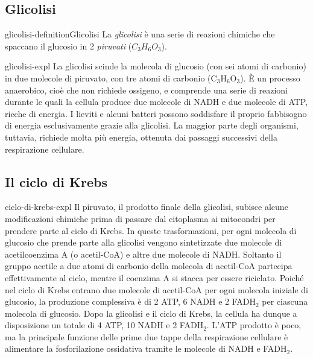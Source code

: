 \documentclass[preview]{standalone}
\begin{document}
\subsection{Glicolisi}

\begin{snippetdefinition}{glicolisi-definition}{Glicolisi}
    La \textit{glicolisi} è una serie di reazioni chimiche che spaccano il glucosio in 2 \textit{piruvati} (\(C_3H_6O_3\)).
\end{snippetdefinition}

\begin{snippet}{glicolisi-expl}
    La glicolisi scinde la molecola di glucosio (con sei atomi di carbonio) in due molecole di
    piruvato, con tre atomi di carbonio (C\({}_3\)H\({}_6\)O\({}_3\)). È un processo anaerobico, cioè che non
    richiede ossigeno, e comprende una serie di reazioni durante le quali la cellula produce due
    molecole di NADH e due molecole di ATP, ricche di energia. I lieviti e alcuni batteri possono
    soddisfare il proprio fabbisogno di energia esclusivamente grazie alla glicolisi. La maggior
    parte degli organismi, tuttavia, richiede molta più energia, ottenuta dai passaggi successivi
    della respirazione cellulare.
\end{snippet}

\subsection{Il ciclo di Krebs}

\begin{snippet}{ciclo-di-krebs-expl}
    Il piruvato, il prodotto finale della glicolisi, subisce alcune modificazioni chimiche prima di
    passare dal citoplasma ai mitocondri per prendere parte al ciclo di Krebs. In queste
    trasformazioni, per ogni molecola di glucosio che prende parte alla glicolisi vengono
    sintetizzate due molecole di acetilcoenzima A (o acetil-CoA) e altre due molecole di NADH.
    Soltanto il gruppo acetile a due atomi di carbonio della molecola di acetil-CoA partecipa
    effettivamente al ciclo, mentre il coenzima A si stacca per essere riciclato. Poiché nel ciclo
    di Krebs entrano due molecole di acetil-CoA per ogni molecola iniziale di glucosio, la
    produzione complessiva è di 2 ATP, 6 NADH e 2 FADH\({}_2\) per ciascuna molecola di glucosio.
    Dopo la glicolisi e il ciclo di Krebs, la cellula ha dunque a disposizione un totale di 4 ATP, 10
    NADH e 2 FADH\({}_2\). L'ATP prodotto è poco, ma la principale funzione delle prime due tappe
    della respirazione cellulare è alimentare la fosforilazione ossidativa tramite le molecole di
    NADH e FADH\({}_2\).
\end{snippet}
\end{document}
